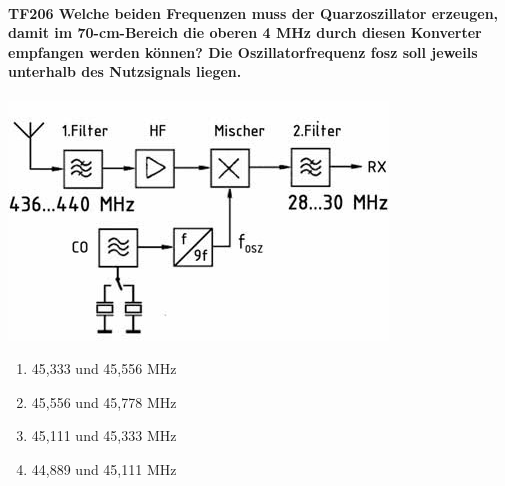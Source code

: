 \documentclass[8pt]{article}
\begin{document}
\begin{enumerate}
\paragraph*{TF206 Welche beiden Frequenzen muss der Quarzoszillator erzeugen, damit im 70-cm-Bereich die oberen 4 MHz durch diesen Konverter empfangen werden können? Die Oszillatorfrequenz fosz soll jeweils unterhalb des Nutzsignals liegen.}
\begin{center}
	\begin{minipage}{\linewidth}
		\centering
		\includegraphics[scale=1.0]{pics/tf206_a.jpg}
	\end{minipage}
\end{center}
\begin{enumerate}[nolistsep,label=\Alph*]
\item 45,333 und 45,556 MHz
\item 45,556 und 45,778 MHz
\item 45,111 und 45,333 MHz
\item 44,889 und 45,111 MHz
\end{enumerate}


\end{enumerate}
\end{document}
